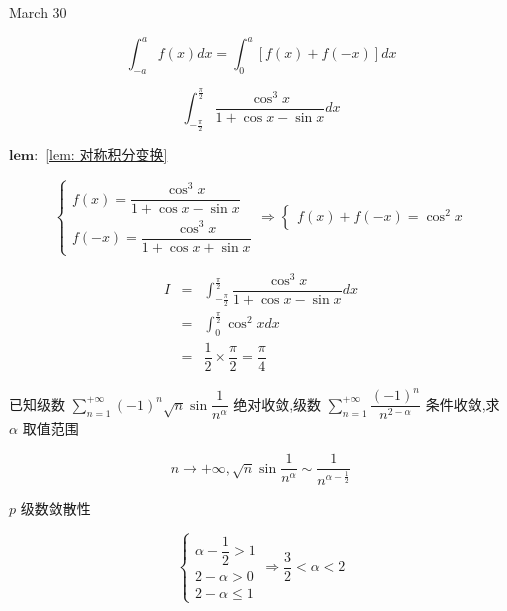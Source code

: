 \textcolor{purplea}{March 30}

\begin{lemma}[对称积分变换]\label{lem: 对称积分变换}
	$$\int_{-a}^{a}f(x)dx=\int_{0}^{a}\left[f(x) + f(-x)\right]dx$$
\end{lemma}

\begin{example}[][Exam: 29.4.16]
	$$\int_{-\frac{\pi}{2}}^{\frac{\pi}{2}}\dfrac{\cos^3 x}{1+\cos x-\sin x}dx$$
\end{example}


\begin{solution}
	
	$\mathbf{lem: }$ \ref{lem: 对称积分变换}
	
	$$\begin{cases}
	  f(x) = \dfrac{\cos^3 x}{1+\cos x-\sin x} \\
	  f(-x) = \dfrac{\cos^3 x}{1+\cos x+\sin x}
	\end{cases}\Rightarrow
	\begin{cases}
	  f(x) + f(-x) = \cos^{2}x
	\end{cases}$$
	
	\begin{eqnarray*}
		I & = & \int_{-\frac{\pi}{2}}^{\frac{\pi}{2}}\dfrac{\cos^3 x}{1+\cos x-\sin x}dx\\
		  & = & \int_{0}^{\frac{\pi}{2}}\cos^{2}x dx\\
		  & = & \dfrac{1}{2}\times\dfrac{\pi}{2} = \dfrac{\pi}{4}
	\end{eqnarray*}
\end{solution}

\begin{example}[][Exam: 29.4.17]
	已知级数 $\sum\limits_{n=1}^{+\infty}(-1)^n\sqrt{n}\sin \dfrac{1}{n^{\alpha}}$ 绝对收敛,级数 $\sum\limits_{n=1}^{+\infty}\dfrac{(-1)^n}{n^{2-\alpha}}$ 条件收敛,求 $\alpha$ 取值范围
\end{example}

\begin{solution}
	
	$$n\to +\infty, \sqrt{n}\sin \dfrac{1}{n^{\alpha}}\sim \dfrac{1}{n^{\alpha-\frac{1}{2}}}$$
	
	$p$ 级数敛散性

	$$\begin{cases}
	  \alpha - \dfrac{1}{2} > 1\\
	  2 - \alpha > 0\\
	  2 - \alpha\leq 1
	\end{cases}\Rightarrow \dfrac{3}{2} < \alpha < 2$$
\end{solution}

